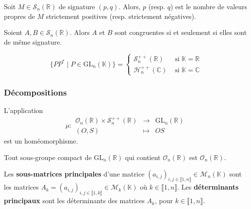   
  \begin{remark}
    Soit $M \in \mathcal{S}_n(\mathbb{R})$ de signature $(p,q)$. Alors, $p$ (resp. $q$) est le nombre de valeurs propres de $M$ strictement positives (resp. strictement négatives).
  \end{remark}
  
  \begin{corollary}
    Soient $A, B \in \mathcal{S}_n(\mathbb{R})$. Alors $A$ et $B$ sont congruentes si et seulement si elles sont de même signature.
  \end{corollary}
  
  
  \begin{application}
    \[
      \{ P P^* \mid P \in \mathrm{GL}_n(\mathbb{K}) \} =
      \begin{cases}
        \mathcal{S}_n^{++}(\mathbb{R}) &\text{ si } \mathbb{K} = \mathbb{R} \\
        \mathcal{H}_n^{++}(\mathbb{C}) &\text{ si } \mathbb{K} = \mathbb{C}
      \end{cases}
    \]
  \end{application}
  
  \subsubsection{Décompositions}
  
  
  \begin{application}
    L'application
    \[ \mu :
    \begin{array}{ccc}
      \mathcal{O}_n(\mathbb{R}) \times \mathcal{S}_n^{++}(\mathbb{R}) &\rightarrow& \mathrm{GL}_n(\mathbb{R}) \\
      (O, S) &\mapsto& OS
    \end{array}
    \]
    est un homéomorphisme.
  \end{application}
  
  \begin{corollary}
    Tout sous-groupe compact de $\mathrm{GL}_n(\mathbb{R})$ qui contient $\mathcal{O}_n(\mathbb{R})$ est $\mathcal{O}_n(\mathbb{R})$.
  \end{corollary}
  
  
  \begin{definition}
    Les \textbf{sous-matrices principales} d'une matrice $(a_{i,j})_{i,j \in \llbracket 1, n \rrbracket} \in \mathcal{M}_n(\mathbb{K})$ sont les matrices $A_k = (a_{i,j})_{i,j \in \llbracket 1, k \rrbracket} \in \mathcal{M}_k(\mathbb{K})$ où $k \in \llbracket 1, n \rrbracket$. Les \textbf{déterminants principaux} sont les déterminants des matrices $A_k$, pour $k \in \llbracket 1, n \rrbracket$.
  \end{definition}
  
